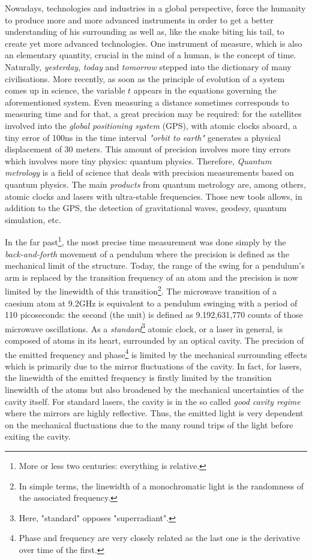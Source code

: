 \documentclass[11pt]{report}
\begin{document}
Nowadays, technologies and industries in a global perspective, force the humanity to produce more and more advanced instruments in order to get a better understanding of his surrounding as well as, like the snake biting his tail, to create yet more advanced technologies. One instrument of measure, which is also an elementary quantity, crucial in the mind of a human, is the concept of time. Naturally, \textit{yesterday}, \textit{today} and \textit{tomorrow} stepped into the dictionary of many civilisations. More recently, as soon as the principle of evolution of a system comes up in science, the variable $t$ appears in the equations governing the aforementioned system. Even measuring a distance sometimes corresponds to measuring time and for that, a great precision may be required: for the satellites involved into the \textit{global positioning system} (GPS), with atomic clocks aboard, a tiny error of 100ns in the time interval \textit{"orbit to earth"} generates a physical displacement of 30 meters. This amount of precision involves more tiny errors which involves more tiny physics: quantum physics. Therefore, \textit{Quantum metrology} is a field of science that deals with precision measurements based on quantum physics. The main \textit{products} from quantum metrology are, among others, atomic clocks and lasers with ultra-stable frequencies. Those new tools allows, in addition to the GPS, the detection of gravitational waves, geodesy, quantum simulation, etc. 

In the far past\footnote{More or less two centuries: everything is relative.}, the most precise time measurement was done simply by the \textit{back-and-forth} movement of a pendulum where the precision is defined as the mechanical limit of the structure. Today, the range of the swing for a pendulum's arm is replaced by the transition frequency of an atom and the precision is now limited by the linewidth of this transition\footnote{In simple terms, the linewidth of a monochromatic light is the randomness of the associated frequency.}. The microwave transition of a caesium atom at 9.2GHz is equivalent to a pendulum swinging with a period of 110 picoseconds: the second (the unit) is defined as 9.192,631,770 counts of those microwave oscillations. As a \textit{standard}\footnote{Here, "standard" opposes "superradiant".} atomic clock, or a laser in general, is composed of atoms in its heart, surrounded by an optical cavity. The precision of the emitted frequency and phase\footnote{Phase and frequency are very closely related as the last one is the derivative over time of the first.} is limited by the mechanical surrounding effects which is primarily due to the mirror fluctuations of the cavity. In fact, for lasers, the linewidth of the emitted frequency is firstly limited by the transition linewidth of the atoms but also broadened by the mechanical uncertainties of the cavity itself. For standard lasers, the cavity is in the so called \textit{good cavity regime} where the mirrors are highly reflective. Thus, the emitted light is very dependent on the mechanical fluctuations due to the many round trips of the light before exiting the cavity. 
\end{document}
